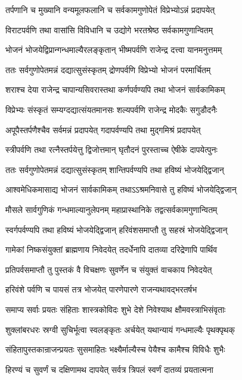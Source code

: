 \twolineshloka
{तर्पणानि च मुख्यानि वन्यमूलफलानि च}
{सर्वकामगुणोपेतं विप्रेभ्योऽन्नं प्रदापयेत्}


\twolineshloka
{विराटपर्वणि तथा वासांसि विविधानि च}
{उद्योगे भरतश्रेष्ठ सर्वकामगुणान्वितम्}


\twolineshloka
{भोजनं भोजयेद्विप्रान्गन्धमाल्यैरलङ्कृतान्}
{भीष्मपर्वणि राजेन्द्र दत्त्वा यानमनुत्तमम्}


\twolineshloka
{ततः सर्वगुणोपेतमन्नं दद्यात्सुसंस्कृतम्}
{द्रोणपर्वणि विप्रेभ्यो भोजनं परमार्चितम्}


\twolineshloka
{शराश्च देया राजेन्द्र चापान्यसिवरास्तथा}
{कर्णपर्वण्यपि तथा भोजनं सार्वकामिकम्}


\twolineshloka
{विप्रेभ्यः संस्कृतं सम्यग्दद्यात्संयतमानसः}
{शल्यपर्वणि राजेन्द्र मोदकैः सगुडौदनैः}


\twolineshloka
{अपूपैस्तर्पणैश्चैव सर्वमन्नं प्रदापयेत्}
{गदापर्वण्यपि तथा मुद्गमिश्रं प्रदापयेत्}


\twolineshloka
{स्त्रीपर्वणि तथा रत्नैस्तर्पयेत्तु द्विजोत्तमान्}
{घृतौदनं पुरस्ताच्च ऐषीके दापयेत्पुनः}


\twolineshloka
{ततः सर्वगुणोपेतमन्नं दद्यात्सुसंस्कृतम्}
{शान्तिपर्वण्यपि तथा हविष्यं भोजयेद्द्विजान्}


\twolineshloka
{आश्वमेधिकमासाद्य भोजनं सार्वकामिकम्}
{तथाऽऽश्रमनिवासे तु हविष्यं भोजयेद्द्विजान्}


\twolineshloka
{मौसले सार्वगुणिकं गन्धमाल्यानुलेपनम्}
{महाप्रास्थानिके तद्वत्सर्वकामगुणान्वितम्}


\twolineshloka
{स्वर्गपर्वण्यपि तथा हविष्यं भोजयेद्द्विजान्}
{हरिवंशसमाप्तौ तु सहस्रं भोजयेद्द्विजान्}


\twolineshloka
{गामेकां निष्कसंयुक्तां ब्राह्मणाय निवेदयेत्}
{तदर्धेनापि दातव्या दरिद्रेणापि पार्थिव}


\twolineshloka
{प्रतिपर्वसमाप्तौ तु पुस्तकं वै विचक्षणः}
{सुवर्णेन च संयुक्तं वाचकाय निवेदयेत्}


\twolineshloka
{हरिवंशे पर्वणि च पायसं तत्र भोजयेत्}
{पारणेपारणे राजन्यथावद्भरतर्षभ}


\twolineshloka
{समाप्य सर्वाः प्रयतः संहिताः शास्त्रकोविदः}
{शुभे देशे निवेश्याथ क्षौमवस्त्राभिसंवृताः}


\threelineshloka
{शुक्लांबरधरः स्रग्वी सुचिर्भूत्वा स्वलङ्कृतः}
{अर्चयेत् यथान्यायं गन्धमाल्यैः पृथक्पृथक्}
{}


\twolineshloka
{संहितापुस्तकान्राजन्प्रयतः सुसमाहितः}
{भक्ष्यैर्माल्यैस्च पेयैश्च कामैश्च विविधैः शुभैः}


\twolineshloka
{हिरण्यं च सुवर्णं च दक्षिणामथ दापयेत्}
{सर्वत्र त्रिपलं स्वर्णं दातव्यं प्रयतात्मना}


